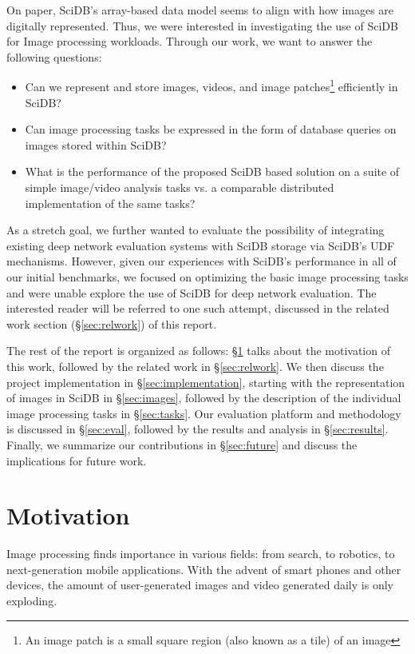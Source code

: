 \documentclass[letterpaper,twocolumn,10pt]{article}
\begin{document}
On paper, SciDB's array-based data model seems to align with how images are digitally represented. Thus, we were interested in investigating the use of SciDB for Image processing workloads. Through our work, we want to answer the following questions:

\begin{itemize}
\item Can we represent and store images, videos, and image patches\footnote{An image patch is a small square region (also known as a tile) of an image} efficiently in SciDB?
\item Can image processing tasks be expressed in the form of database queries on images stored within SciDB?
\item What is the performance of the proposed SciDB based solution 
on a suite of simple image/video analysis tasks vs. a comparable distributed implementation of the same tasks?
\end{itemize}

As a stretch goal, we further wanted to evaluate the possibility of integrating existing deep network evaluation systems with SciDB storage via SciDB's UDF mechanisms. However, given our experiences with SciDB's performance in all of our initial benchmarks, we focused on optimizing the basic image processing tasks and were unable explore the use of SciDB for deep network evaluation. The interested reader will be referred to one such attempt, discussed in the related work section (\S \ref{sec:relwork}) of this report.

The rest of the report is organized as follows: \S\ref{sec:motivation} talks about the motivation of this work, followed by the related work in \S\ref{sec:relwork}. We then discuss the project implementation in \S\ref{sec:implementation}, starting with the representation of images in SciDB in \S\ref{sec:images}, followed by the description of the individual image processing tasks in \S\ref{sec:tasks}. Our evaluation platform and methodology is discussed in \S\ref{sec:eval}, followed by the results and analysis in \S\ref{sec:results}. Finally, we summarize our contributions in \S\ref{sec:future} and discuss the implications for future work.

\section{Motivation}\label{sec:motivation}
Image processing finds importance in various fields: from search, to robotics, to next-generation mobile applications. With the advent of smart phones and other devices, the amount of user-generated images and video generated daily is only exploding. 
\end{document}
